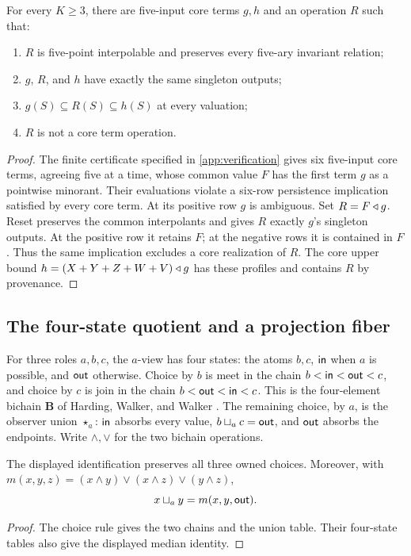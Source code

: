 \begin{theorem}
\label{core:thm:five-local-profile}
For every $K\geq3$, there are five-input core terms $g,h$ and an
operation $R$ such that:
\begin{enumerate}[label=(\roman*)]
\item $R$ is five-point interpolable and preserves every five-ary
invariant relation;
\item $g$, $R$, and $h$ have exactly the same singleton outputs;
\item $g(S)\subseteq R(S)\subseteq h(S)$ at every valuation;
\item $R$ is not a core term operation.
\end{enumerate}
\end{theorem}
\begin{proof}
The finite certificate specified in \cref{app:verification} gives six
five-input core terms, agreeing five at a time, whose common value $F$
has the first term $g$ as a pointwise minorant. Their evaluations violate
a six-row persistence implication satisfied by every core term.
At its positive row $g$ is ambiguous. Set $R=F\mathbin{\triangleleft} g$.
Reset preserves the common interpolants and gives $R$ exactly $g$'s
singleton outputs. At the positive row it retains $F$; at the negative
rows it is contained in $F$. Thus the same implication excludes a core
realization of $R$. The core upper bound
$h=(X+Y+Z+W+V)\mathbin{\triangleleft} g$ has these profiles and contains $R$ by provenance.
\end{proof}

\subsection{The four-state quotient and a projection fiber}
\label{app:core-bichain}

For three roles $a,b,c$, the $a$-view has four states: the atoms $b,c$,
$\mathsf{in}$ when $a$ is possible, and $\mathsf{out}$ otherwise. Choice by $b$
is meet in the chain $b<\mathsf{in}<\mathsf{out}<c$, and choice by $c$ is
join in the chain $b<\mathsf{out}<\mathsf{in}<c$. This is the four-element
bichain $\mathbf B$ of Harding, Walker, and Walker
\cite[Figure~1]{HardingWalkerWalker2013}. The remaining choice, by $a$,
is the observer union $\star_a$: $\mathsf{in}$ absorbs every value,
$b\sqcup_a c=\mathsf{out}$, and $\mathsf{out}$ absorbs the endpoints.
Write $\wedge,\vee$ for the two bichain operations.

\begin{proposition}\label{core:prop:bichain}
The displayed identification preserves all three owned choices. Moreover,
with $m(x,y,z)=(x\wedge y)\vee(x\wedge z)\vee(y\wedge z)$,
\[
 x\sqcup_a y=m(x,y,\mathsf{out}).
\]
\end{proposition}
\begin{proof}
The choice rule gives the two chains and the union table. Their four-state
tables also give the displayed median identity.
\end{proof}

